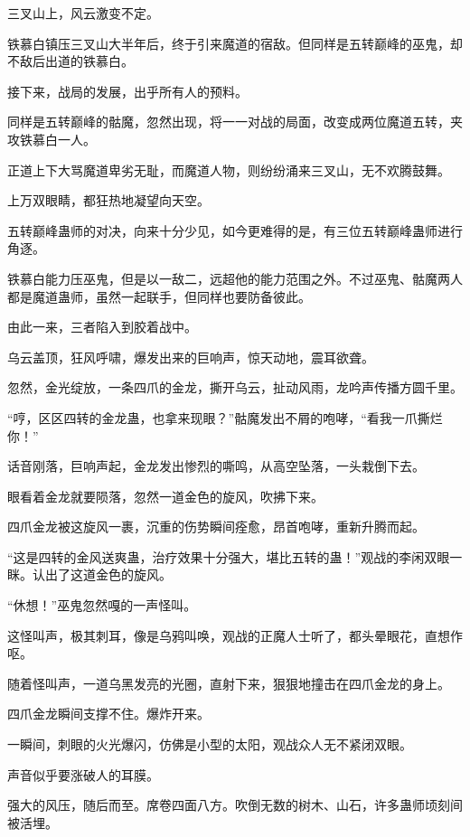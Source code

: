 
\begin{this_body}



三叉山上，风云激变不定。

铁慕白镇压三叉山大半年后，终于引来魔道的宿敌。但同样是五转巅峰的巫鬼，却不敌后出道的铁慕白。

接下来，战局的发展，出乎所有人的预料。

同样是五转巅峰的骷魔，忽然出现，将一一对战的局面，改变成两位魔道五转，夹攻铁慕白一人。

正道上下大骂魔道卑劣无耻，而魔道人物，则纷纷涌来三叉山，无不欢腾鼓舞。

上万双眼睛，都狂热地凝望向天空。

五转巅峰蛊师的对决，向来十分少见，如今更难得的是，有三位五转巅峰蛊师进行角逐。

铁慕白能力压巫鬼，但是以一敌二，远超他的能力范围之外。不过巫鬼、骷魔两人都是魔道蛊师，虽然一起联手，但同样也要防备彼此。

由此一来，三者陷入到胶着战中。

乌云盖顶，狂风呼啸，爆发出来的巨响声，惊天动地，震耳欲聋。

忽然，金光绽放，一条四爪的金龙，撕开乌云，扯动风雨，龙吟声传播方圆千里。

“哼，区区四转的金龙蛊，也拿来现眼？”骷魔发出不屑的咆哮，“看我一爪撕烂你！”

话音刚落，巨响声起，金龙发出惨烈的嘶鸣，从高空坠落，一头栽倒下去。

眼看着金龙就要陨落，忽然一道金色的旋风，吹拂下来。

四爪金龙被这旋风一裹，沉重的伤势瞬间痊愈，昂首咆哮，重新升腾而起。

“这是四转的金风送爽蛊，治疗效果十分强大，堪比五转的蛊！”观战的李闲双眼一眯。认出了这道金色的旋风。

“休想！”巫鬼忽然嘎的一声怪叫。

这怪叫声，极其刺耳，像是乌鸦叫唤，观战的正魔人士听了，都头晕眼花，直想作呕。

随着怪叫声，一道乌黑发亮的光圈，直射下来，狠狠地撞击在四爪金龙的身上。

四爪金龙瞬间支撑不住。爆炸开来。

一瞬间，刺眼的火光爆闪，仿佛是小型的太阳，观战众人无不紧闭双眼。

声音似乎要涨破人的耳膜。

强大的风压，随后而至。席卷四面八方。吹倒无数的树木、山石，许多蛊师顷刻间被活埋。


\end{this_body}
